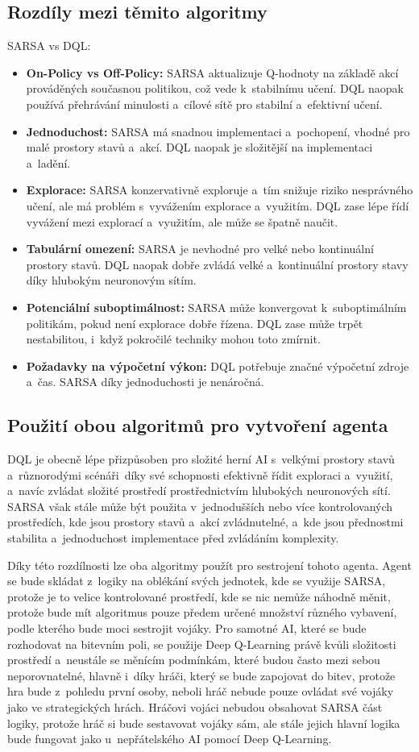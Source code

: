 \subsection{Rozdíly mezi těmito algoritmy}
SARSA vs DQL:
\begin{itemize}
	\item \textbf{On-Policy vs Off-Policy:} SARSA aktualizuje Q-hodnoty na základě akcí prováděných současnou politikou, což vede k~stabilnímu učení. DQL naopak používá přehrávání minulosti a~cílové sítě pro stabilní a~efektivní učení.
     \item \textbf{Jednoduchost:} SARSA má snadnou implementaci a~pochopení, vhodné pro malé prostory stavů a~akcí. DQL naopak je složitější na implementaci a~ladění.
     \item \textbf{Explorace:} SARSA konzervativně exploruje a~tím snižuje riziko nesprávného učení, ale má problém s~vyvážením explorace a~využitím. DQL zase lépe řídí vyvážení mezi explorací a~využitím, ale může se špatně naučit.
     \item \textbf{Tabulární omezení:} SARSA je nevhodné pro velké nebo kontinuální prostory stavů. DQL naopak dobře zvládá velké a~kontinuální prostory stavy díky hlubokým neuronovým sítím.
     \item \textbf{Potenciální suboptimálnost:} SARSA může konvergovat k~suboptimálním politikám, pokud není explorace dobře řízena. DQL zase může trpět nestabilitou, i~když pokročilé techniky mohou toto zmírnit.
     \item \textbf{Požadavky na výpočetní výkon:} DQL potřebuje značné výpočetní zdroje a~čas. SARSA díky jednoduchosti je nenáročná.
\end{itemize}

\subsection{Použití obou algoritmů pro vytvoření agenta}
DQL je obecně lépe přizpůsoben pro složité herní AI s~velkými prostory stavů a~různorodými scénáři~díky své schopnosti efektivně řídit exploraci a~využití, a~navíc zvládat složité prostředí prostřednictvím hlubokých neuronových sítí. SARSA však stále může být použita v~jednodušších nebo více kontrolovaných prostředích, kde jsou prostory stavů a~akcí zvládnutelné, a~kde jsou přednostmi stabilita a~jednoduchost implementace před zvládáním komplexity. 

Díky této rozdílnosti lze oba algoritmy použít pro sestrojení tohoto agenta. Agent se bude skládat z~logiky na oblékání svých jednotek, kde se využije SARSA, protože je to velice kontrolované prostředí, kde se nic nemůže náhodně měnit, protože bude mít algoritmus pouze předem určené množství různého vybavení, podle kterého bude moci sestrojit vojáky. Pro samotné AI, které se bude rozhodovat na bitevním poli, se použije Deep Q-Learning právě kvůli složitosti prostředí a~neustále se měnícím podmínkám, které budou často mezi sebou neporovnatelné, hlavně i~díky hráči, který se bude zapojovat do bitev, protože hra bude z~pohledu první osoby, neboli hráč nebude pouze ovládat své vojáky jako ve strategických hrách. Hráčovi vojáci nebudou obsahovat SARSA část logiky, protože hráč si bude sestavovat vojáky sám, ale stále jejich hlavní logika bude fungovat jako u~nepřátelského AI pomocí Deep Q-Learning.
